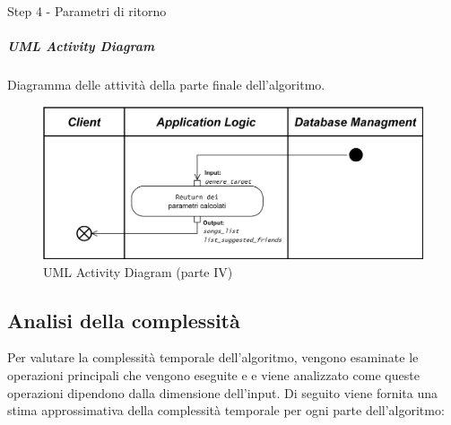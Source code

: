 \begin{algorithm}

    \caption{Step 4 - Parametri di ritorno}
    \SetAlgoLined
   
\end{algorithm}
\vspace{1cm}
\subparagraph{UML Activity Diagram}
Diagramma delle attività della parte finale dell'algoritmo.
\vspace{0.3cm}
\begin{figure} [H]
    \centering
    \includegraphics[scale=0.8]{images/flowchart_4_UML_ver2.png}
    \caption{UML Activity Diagram (parte IV)}
    \label{fig-uml-ac-4}
\end{figure}




\newpage
\subsection{Analisi della complessità}
Per valutare la complessità temporale dell'algoritmo, vengono esaminate le operazioni principali che 
vengono eseguite e e viene analizzato come queste operazioni dipendono dalla dimensione dell'input. 
Di seguito viene fornita una stima approssimativa della complessità temporale per ogni parte dell'algoritmo:

